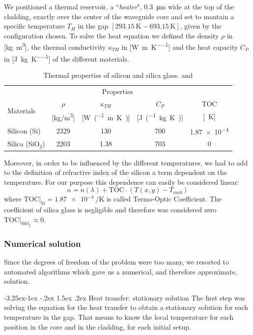 \documentclass[12pt,a4paper,twoside]{article}
\makeatletter
\renewcommand\paragraph{
   \@startsection{paragraph}{4}{\z@}%
   {-3.25ex\@plus -1ex \@minus -.2ex}%
   {1.5ex \@plus .2ex}%
   {\normalfont\normalsize\bfseries}}
\makeatother
\begin{document}
We positioned a thermal reservoir, a ``\textit{heater}", \SI{0.3}{\um} wide at the top of the cladding, exactly over the center of the waveguide core and set to mantain a specific temperature $T_H$ in the gap $[\SI{293.15}{\K} - \SI{693.15}{\K}]$, given by the configuration chosen.
To solve the heat equation we defined the density $\rho$ in [\si{\kg\m^3}], the thermal conductivity $\kappa_{TH}$ in [\si{\W\per\m\per\K}] and the heat capacity $C_P$ in [\si{\J\per\kg\per\K}] of the different materials.

\begin{table}[ht]
\centering
  \begin{tabular}{lcccc}  
    \toprule
		& \multicolumn{3}{c}{Properties} \\
    \cmidrule(r){2-5}
    	\multirow{2}{*}{Materials}    & $\rho$ & $\kappa_{TH}$ & $C_P$ & TOC\\
  		& [\si{\kg/\m^3}] & [\si{\W\per(\m\K)}] & [\si{\J\per(\kg\K)}] & [\si{\per\K}] \\
    \midrule
    Silicon (Si)			& 2329	& 130	& 700	& \num{1.87e-4}\\
    Silica (SiO$_2$)		& 2203	& 1.38	& 703	& 0\\
    \bottomrule
  \end{tabular}
  \label{tab_materials}
  \caption{Thermal properties of silicon and silica glass. \cite{n_db} and \cite{toc}}
\end{table}

Moreover, in order to be influenced by the different temperatures, we had to add to the definition of refractive index of the silicon a term dependent on the temperature.
For our purpose this dependence can easily be considered linear:
\begin{equation}
n = n(\lambda)+\mathrm{TOC}\cdot (T(x,y)-T_{amb})
\end{equation}
where $\mathrm{TOC}|_{\mathrm{Si}} = \SI{1.87e-4}{\per\K}$ is called Termo-Optic Coefficient. The coefficient of silica glass is negligible and therefore was considered zero $\mathrm{TOC}|_{\mathrm{SiO}_2} \approx 0$.

\subsubsection{Numerical solution}
Since the degrees of freedom of the problem were too many, we resorted to automated algorithms which gave us a numerical, and therefore approximate, solution.

\paragraph{Heat transfer: stationary solution}
The first step was solving the equation for the heat transfer to obtain a stationary solution for each temperature in the gap.
That means to know the local temperature for each position in the core and in the cladding, for each initial setup.
\end{document}
